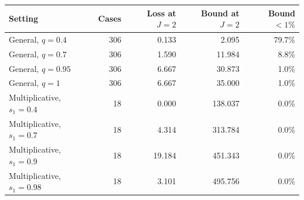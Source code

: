 \begin{tabular}{lrrrr}
\toprule
Setting & Cases & Loss at $J=2$ & Bound at $J=2$ & Bound $<1\%$ \\
\midrule
General, $q=0.4$ & 306 & 0.133 & 2.095 & 79.7\% \\
General, $q=0.7$ & 306 & 1.590 & 11.984 & 8.8\% \\
General, $q=0.95$ & 306 & 6.667 & 30.873 & 1.0\% \\
General, $q=1$ & 306 & 6.667 & 35.000 & 1.0\% \\
Multiplicative, $s_1=0.4$ & 18 & 0.000 & 138.037 & 0.0\% \\
Multiplicative, $s_1=0.7$ & 18 & 4.314 & 313.784 & 0.0\% \\
Multiplicative, $s_1=0.9$ & 18 & 19.184 & 451.343 & 0.0\% \\
Multiplicative, $s_1=0.98$ & 18 & 3.101 & 495.756 & 0.0\% \\
\bottomrule
\end{tabular}
